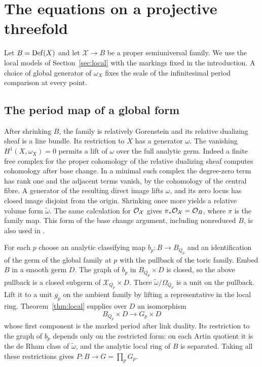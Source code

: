 \section{The equations on a projective threefold}\label{sec:compact}

Let $B=\operatorname{Def}(X)$ and let $\mathcal X\to B$ be a proper semiuniversal
family. We use the local models of Section~\ref{sec:local} with the
markings fixed in the introduction. A choice of global generator of
$\omega_X$ fixes the scale of the infinitesimal period comparison
at every point.

\subsection{The period map of a global form}
After shrinking $B$, the family is relatively Gorenstein and its
relative dualizing sheaf is a line bundle. Its restriction to $X$
has a generator $\omega$. The vanishing $H^1(X,\omega_X)=0$ permits
a lift of $\omega$ over the full analytic germ. Indeed a finite free
complex for the proper cohomology of the relative dualizing sheaf
computes cohomology after base change. In a minimal such complex the
degree-zero term has rank one and the adjacent terms vanish, by the
cohomology of the central fibre. A generator of the resulting direct
image lifts $\omega$, and its zero locus has closed image disjoint
from the origin. Shrinking once more yields a relative volume form
$\widetilde\omega$. The same calculation for $\mathcal O_{\mathcal X}$
gives $\pi_*\mathcal O_{\mathcal X}=\mathcal O_B$, where $\pi$ is the family map.
This form of the base change argument, including nonreduced $B$,
is also used in \cite[\S2]{Wue}.

For each $p$ choose an analytic classifying map $b_p:B\to B_{Q_p}$
and an identification of the germ of the global family at $p$ with
the pullback of the toric family. Embed $B$ in a smooth germ $D$.
The graph of $b_p$ in $B_{Q_p}\times D$ is closed, so the above
pullback is a closed subgerm of $\mathcal X_{Q_p}\times D$. There
$\widetilde\omega/\Omega_{Q_p}$ is a unit on the pullback. Lift it to
a unit $g_p$ on the ambient family by lifting a representative in the
local ring. Theorem~\ref{thm:local} supplies over $D$ an isomorphism
\[
  B_{Q_p}\times D\longrightarrow G_p\times D
\]
whose first component is the marked period after link duality. Its
restriction to the graph of $b_p$ depends only on the restricted form:
on each Artin quotient it is the de Rham class of
$\widetilde\omega$, and the analytic local ring of $B$ is separated.
Taking all these restrictions gives $P:B\to G=\prod_pG_p$.

